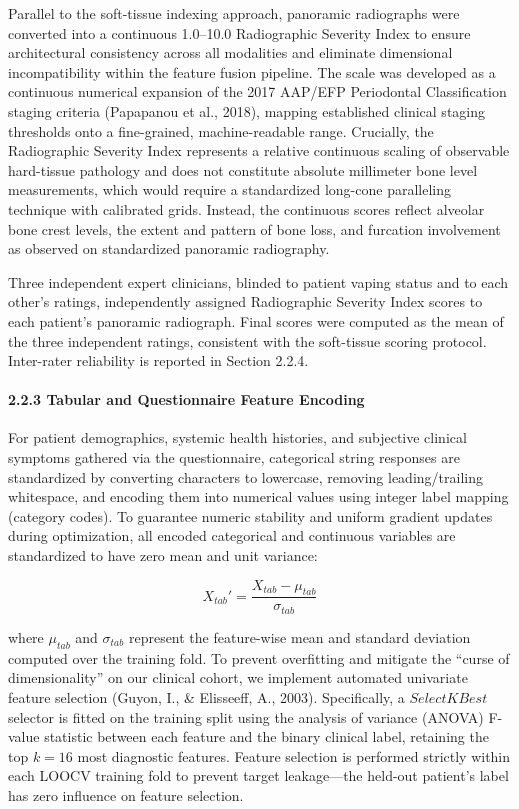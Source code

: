 \documentclass[
]{article}
\begin{document}
Parallel to the soft-tissue indexing approach, panoramic radiographs
were converted into a continuous 1.0--10.0 Radiographic Severity Index
to ensure architectural consistency across all modalities and eliminate
dimensional incompatibility within the feature fusion pipeline. The
scale was developed as a continuous numerical expansion of the 2017
AAP/EFP Periodontal Classification staging criteria (Papapanou et al.,
2018), mapping established clinical staging thresholds onto a
fine-grained, machine-readable range. Crucially, the Radiographic
Severity Index represents a relative continuous scaling of observable
hard-tissue pathology and does not constitute absolute millimeter bone
level measurements, which would require a standardized long-cone
paralleling technique with calibrated grids. Instead, the continuous
scores reflect alveolar bone crest levels, the extent and pattern of
bone loss, and furcation involvement as observed on standardized
panoramic radiography.

Three independent expert clinicians, blinded to patient vaping status
and to each other's ratings, independently assigned Radiographic
Severity Index scores to each patient's panoramic radiograph. Final
scores were computed as the mean of the three independent ratings,
consistent with the soft-tissue scoring protocol. Inter-rater
reliability is reported in Section 2.2.4.

\paragraph{\texorpdfstring{\textbf{2.2.3 Tabular and Questionnaire
Feature
Encoding}}{2.2.3 Tabular and Questionnaire Feature Encoding}}\label{tabular-and-questionnaire-feature-encoding}

For patient demographics, systemic health histories, and subjective
clinical symptoms gathered via the questionnaire, categorical string
responses are standardized by converting characters to lowercase,
removing leading/trailing whitespace, and encoding them into numerical
values using integer label mapping (category codes). To guarantee
numeric stability and uniform gradient updates during optimization, all
encoded categorical and continuous variables are standardized to have
zero mean and unit variance:

\[X_{tab}' = \frac{X_{tab} - \mu_{tab}}{\sigma_{tab}}\]

where \(\mu_{tab}\) and \(\sigma_{tab}\) represent the feature-wise mean
and standard deviation computed over the training fold. To prevent
overfitting and mitigate the ``curse of dimensionality'' on our clinical
cohort, we implement automated univariate feature selection (Guyon, I.,
\& Elisseeff, A., 2003). Specifically, a \(SelectKBest\) selector is
fitted on the training split using the analysis of variance (ANOVA)
F-value statistic between each feature and the binary clinical label,
retaining the top \(k = 16\) most diagnostic features. Feature selection
is performed strictly within each LOOCV training fold to prevent target
leakage---the held-out patient's label has zero influence on feature
selection.
\end{document}

